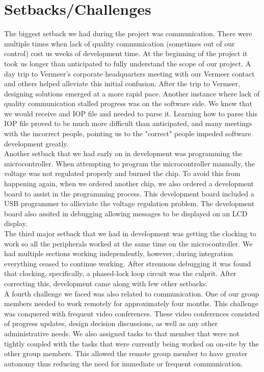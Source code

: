 \documentclass[paper=a4, fontsize=11pt]{scrartcl}
\numberwithin{equation}{section}		%
\numberwithin{figure}{section}			%
\numberwithin{table}{section}				%
\begin{document}
\pagebreak
\section{Setbacks/Challenges} 
The biggest setback we had during the project was communication. There were multiple times when lack of quality communication (sometimes out of our control) cost us weeks of development time. At the beginning of the project it took us longer than anticipated to fully understand the scope of our project. A day trip to Vermeer's corporate headquarters meeting with our Vermeer contact and others helped alleviate this initial confusion. After the trip to Vermeer, designing solutions emerged at a more rapid pace. Another instance where lack of quality communication stalled progress was on the software side. We knew that we would receive and IOP file and needed to parse it. Learning how to parse this IOP file proved to be much more difficult than anticipated, and many meetings with the incorrect people, pointing us to the "correct" people impeded software development greatly. \\

Another setback that we had early on in development was programming the microcontroller. When attempting to program the microcontroller manually, the voltage was not regulated properly and burned the chip. To avoid this from happening again, when we ordered another chip, we also ordered a development board to assist in the programming process. This development board included a USB programmer to allieviate the voltage regulation problem. The development board also assited in debugging allowing messages to be displayed on an LCD display. \\

The third major setback that we had in development was getting the clocking to work so all the peripherals worked at the same time on the microcontroller. We had multiple sections working independently, however, during integration everything ceased to continue working. After strenuous debugging it was found that clocking, specifically, a phased-lock loop circuit was the culprit. After correcting this, development came along with few other setbacks. \\

A fourth challenge we faced was also related to communication. One of our group members needed to work remotely for approximately four months. This challenge was conquered with frequent video conferences. These video conferences consisted of progress updates, design decision discussions, as well as any other administrative needs. We also assigned tasks to that member that were not tightly coupled with the tasks that were currently being worked on on-site by the other group members. This allowed the remote group member to have greater autonomy thus reducing the need for immediate or frequent communication.
\end{document}
